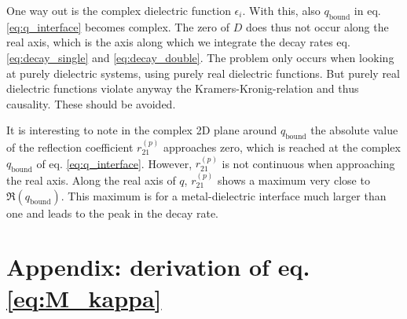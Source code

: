 One way out is the complex dielectric function $\epsilon_i$. With this, also  $q_\text{bound}$ in eq. \ref{eq:q_interface} becomes complex. The zero of $D$ does thus not occur along the real axis, which is the axis along which we integrate the decay rates eq. \ref{eq:decay_single} and \ref{eq:decay_double}.
The problem only occurs when looking at purely dielectric systems, using purely real dielectric functions. But purely real dielectric functions violate anyway the Kramers-Kronig-relation and thus causality. These should be avoided.

It is interesting to note in the complex 2D plane around  $q_\text{bound}$ the absolute value of the 
reflection coefficient $r_{21}^{(p)}$ approaches zero, which is reached  at the complex $q_\text{bound}$ of eq. \ref{eq:q_interface}. 
However, 
 $r_{21}^{(p)}$  is not continuous when approaching the real axis. Along the real axis of $q$, $r_{21}^{(p)}$ shows a maximum very close to $\Re( q_\text{bound})$. This maximum is for a metal-dielectric interface much larger than one and leads to the peak in the decay rate.


\section{Appendix: derivation of eq. \ref{eq:M_kappa}}


